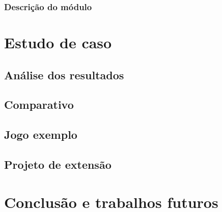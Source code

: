 \documentclass[12pt,twoside,openright,a4paper,english,brazil,sumario=tradicional]{abntex2}
\begin{document}
\subsection{Descrição do módulo}

\chapter{Estudo de caso}
\label{chap:caso}
\section{Análise dos resultados}
\section{Comparativo}
\section{Jogo exemplo}
\section{Projeto de extensão}

\chapter{Conclusão e trabalhos futuros}
\label{chap:conclcsao}

\postextual

\end{document}
